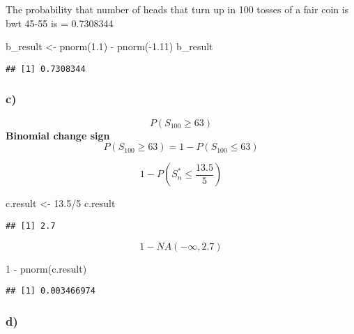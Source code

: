 \documentclass[
]{article}
\newenvironment{Shaded}{\begin{snugshade}}{\end{snugshade}}
\newcommand{\DecValTok}[1]{\textcolor[rgb]{0.00,0.00,0.81}{#1}}
\newcommand{\FloatTok}[1]{\textcolor[rgb]{0.00,0.00,0.81}{#1}}
\newcommand{\FunctionTok}[1]{\textcolor[rgb]{0.00,0.00,0.00}{#1}}
\newcommand{\NormalTok}[1]{#1}
\newcommand{\OtherTok}[1]{\textcolor[rgb]{0.56,0.35,0.01}{#1}}
\newcommand{\SpecialCharTok}[1]{\textcolor[rgb]{0.00,0.00,0.00}{#1}}
\begin{document}
The probability that number of heads that turn up in 100 tosses of a
fair coin is bwt 45-55 is = 0.7308344

\begin{Shaded}
\begin{Highlighting}[]
\NormalTok{b\_result }\OtherTok{\textless{}{-}} \FunctionTok{pnorm}\NormalTok{(}\FloatTok{1.1}\NormalTok{) }\SpecialCharTok{{-}} \FunctionTok{pnorm}\NormalTok{(}\SpecialCharTok{{-}}\FloatTok{1.11}\NormalTok{)}
\NormalTok{b\_result}
\end{Highlighting}
\end{Shaded}

\begin{verbatim}
## [1] 0.7308344
\end{verbatim}

\hypertarget{c}{%
\subsubsection{c)}\label{c}}

\[
P(S_{100}\geq 63)
\] \textbf{Binomial change sign} \[
P(S_{100}\geq 63) = 1 - P(S_{100}\leq 63 )
\]

\[
 1 - P(S^*_{n}\leq \frac{13.5}{5})
\]

\begin{Shaded}
\begin{Highlighting}[]
\NormalTok{c.result }\OtherTok{\textless{}{-}} \FloatTok{13.5}\SpecialCharTok{/}\DecValTok{5}
\NormalTok{c.result}
\end{Highlighting}
\end{Shaded}

\begin{verbatim}
## [1] 2.7
\end{verbatim}

\[
1- NA(- \infty, 2.7)
\]

\begin{Shaded}
\begin{Highlighting}[]
\DecValTok{1} \SpecialCharTok{{-}} \FunctionTok{pnorm}\NormalTok{(c.result)}
\end{Highlighting}
\end{Shaded}

\begin{verbatim}
## [1] 0.003466974
\end{verbatim}

\hypertarget{d}{%
\subsubsection{d)}\label{d}}
\end{document}
